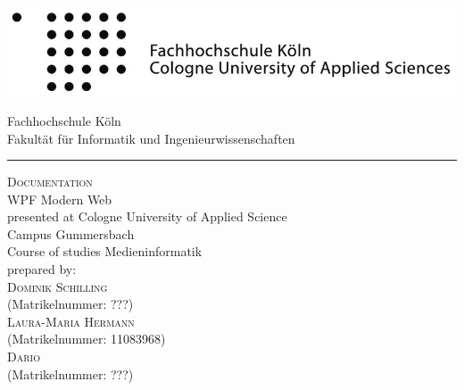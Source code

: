 \documentclass[a4paper,12pt,oneside]{article} %
\begin{document}
 
   
  \pagestyle{empty}
  
  
  \begin{titlepage}
    \includegraphics[scale=1.00]{Sources/logo_fhkoeln_sw}\\
    \begin{center}
      \Large
      Fachhochschule Köln\\
      Fakultät für Informatik und Ingenieurwissenschaften\\
      \hrule\par\rule{0pt}{2cm} %
      \LARGE
      \textsc{Documentation}\\
      \vspace{1cm} %
      \huge
      WPF Modern Web\\
      \Large
      \vspace{1.5cm}
      \large
      presented at Cologne University of Applied Science\\
      Campus Gummersbach\\
      Course of studies
      Medieninformatik\\ 
      \vspace{1.0cm}
      prepared by:\\
      \textsc{Dominik Schilling}\\
      (Matrikelnummer: ???)\\
      \textsc{Laura-Maria Hermann}\\
      (Matrikelnummer: 11083968)\\
      \textsc{Dario }\\
      (Matrikelnummer: ???)\\
      \vspace{1.5cm}
      \vspace{1.5cm}
     
    \end{center}    
  \end{titlepage}
  
  \newpage
 
  
  \tableofcontents
	\pagestyle{fancy}
   		
\end{document}
